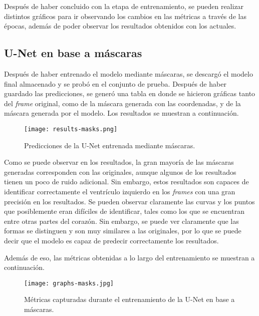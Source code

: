 \documentclass[runningheads]{llncs}
\begin{document}
Después de haber concluido con la etapa de entrenamiento, se pueden realizar distintos gráficos para ir observando los cambios en las métricas a través de las épocas, además de poder observar los resultados obtenidos con los actuales. 

\subsection{U-Net en base a máscaras}
Después de haber entrenado el modelo mediante máscaras, se descargó el modelo final almacenado y se probó en el conjunto de prueba. Después de haber guardado las predicciones, se generó una tabla en donde se hicieron gráficas tanto del \textit{frame} original, como de la máscara generada con las coordenadas, y de la máscara generada por el modelo. Los resultados se muestran a continuación. 

\begin{figure}[H]
    \centering
    \texttt{[image: results-masks.png]}
    \caption{Predicciones de la U-Net entrenada mediante máscaras.}
\end{figure}

Como se puede observar en los resultados, la gran mayoría de las máscaras generadas corresponden con las originales, aunque algunos de los resultados tienen un poco de ruido adicional. Sin embargo, estos resultados son capaces de identificar correctamente el ventrículo izquierdo en los \textit{frames} con una gran precisión en los resultados. Se pueden observar claramente las curvas y los puntos que posiblemente eran difíciles de identificar, tales como los que se encuentran entre otras partes del corazón. Sin embargo, se puede ver claramente que las formas se distinguen y son muy similares a las originales, por lo que se puede decir que el modelo es capaz de predecir correctamente los resultados. 

Además de eso, las métricas obtenidas a lo largo del entrenamiento se muestran a continuación.

\begin{figure}[H]
    \centering
    \texttt{[image: graphs-masks.jpg]}
    \caption{Métricas capturadas durante el entrenamiento de la U-Net en base a máscaras.}
\end{figure}
\end{document}
